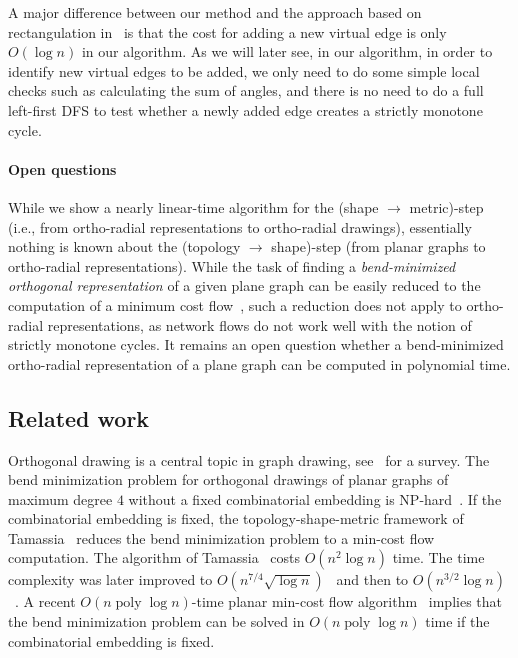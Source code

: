 \documentclass{article}\usepackage[a4paper,margin=20mm]{geometry}
\newcommand{\poly}{\operatorname{poly}}
\begin{document}
A major difference between our method and the approach based on rectangulation in~\cite{barth2023topology} is that the cost for adding a new virtual edge is only $O(\log n)$ in our algorithm. As we will later see, in our algorithm, in order to identify new virtual edges to be added, we only need to do some simple local checks such as calculating the sum of angles, and there is no need to do a full left-first DFS to test whether a newly added edge creates a strictly monotone cycle. 

\paragraph{Open questions} While we show a nearly linear-time algorithm for the (shape $\rightarrow$ metric)-step (i.e., from ortho-radial representations to ortho-radial drawings), essentially nothing is known about the (topology $\rightarrow$ shape)-step (from planar graphs to ortho-radial representations). 
While the task of finding a \emph{bend-minimized orthogonal representation} of a given plane graph can be easily reduced to the computation of a minimum cost flow~\cite{tamassia1987embedding}, such a reduction does not apply to ortho-radial representations, as network flows do not work well with the notion of strictly monotone cycles. It remains an open question whether a bend-minimized ortho-radial representation of a plane graph can be computed in polynomial time.
 
 

\subsection{Related work}
Orthogonal drawing is a central topic in graph drawing, see~\cite{DG13} for a survey. The bend minimization problem for orthogonal drawings of planar graphs of maximum degree $4$ without a fixed combinatorial embedding is NP-hard~\cite{formann1993drawing,GT96}. If the combinatorial embedding is fixed, the topology-shape-metric framework of Tamassia~\cite{tamassia1987embedding} reduces the bend minimization problem to a min-cost flow computation. The algorithm of Tamassia~\cite{tamassia1987embedding} costs $O(n^2 \log n)$ time. The time complexity was later improved to $O\left(n^{7/4} \sqrt{\log n}\right)$~\cite{GT96} and then to $O\left(n^{3/2} \log n\right)$~\cite{CK12}. A recent $O(n \poly \log n)$-time planar min-cost flow algorithm~\cite{dong2022nested} implies that the bend minimization problem can be solved in $O(n \poly \log n)$ time if the combinatorial embedding is fixed.
\end{document}
